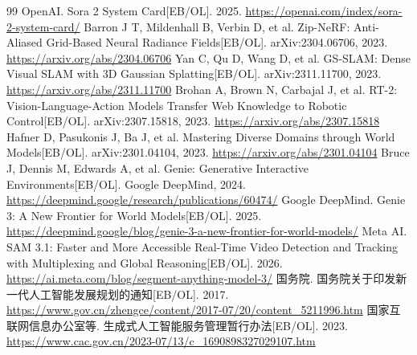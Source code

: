 \documentclass[UTF8,a4paper,12pt]{ctexart}
\begin{document}
\begin{thebibliography}{99}
 OpenAI. Sora 2 System Card[EB/OL]. 2025. \url{https://openai.com/index/sora-2-system-card/}
 Barron J T, Mildenhall B, Verbin D, et al. Zip-NeRF: Anti-Aliased Grid-Based Neural Radiance Fields[EB/OL]. arXiv:2304.06706, 2023. \url{https://arxiv.org/abs/2304.06706}
 Yan C, Qu D, Wang D, et al. GS-SLAM: Dense Visual SLAM with 3D Gaussian Splatting[EB/OL]. arXiv:2311.11700, 2023. \url{https://arxiv.org/abs/2311.11700}
 Brohan A, Brown N, Carbajal J, et al. RT-2: Vision-Language-Action Models Transfer Web Knowledge to Robotic Control[EB/OL]. arXiv:2307.15818, 2023. \url{https://arxiv.org/abs/2307.15818}
 Hafner D, Pasukonis J, Ba J, et al. Mastering Diverse Domains through World Models[EB/OL]. arXiv:2301.04104, 2023. \url{https://arxiv.org/abs/2301.04104}
 Bruce J, Dennis M, Edwards A, et al. Genie: Generative Interactive Environments[EB/OL]. Google DeepMind, 2024. \url{https://deepmind.google/research/publications/60474/}
 Google DeepMind. Genie 3: A New Frontier for World Models[EB/OL]. 2025. \url{https://deepmind.google/blog/genie-3-a-new-frontier-for-world-models/}
 Meta AI. SAM 3.1: Faster and More Accessible Real-Time Video Detection and Tracking with Multiplexing and Global Reasoning[EB/OL]. 2026. \url{https://ai.meta.com/blog/segment-anything-model-3/}
 国务院. 国务院关于印发新一代人工智能发展规划的通知[EB/OL]. 2017. \url{https://www.gov.cn/zhengce/content/2017-07/20/content_5211996.htm}
 国家互联网信息办公室等. 生成式人工智能服务管理暂行办法[EB/OL]. 2023. \url{https://www.cac.gov.cn/2023-07/13/c_1690898327029107.htm}
\end{thebibliography}
\end{document}
